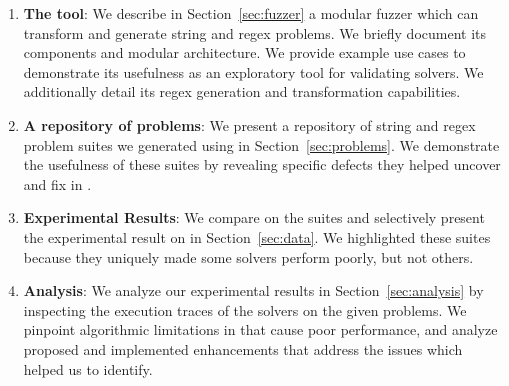         \begin{enumerate}
            \item \textbf{The \fuzzer{} tool}: We describe in Section~\ref{sec:fuzzer} a modular fuzzer which can transform and generate \smtfull{} string and regex problems. We briefly document its components and modular architecture. We provide example use cases to demonstrate its usefulness as an exploratory tool for validating solvers. We additionally detail its regex generation and transformation capabilities.
            \item \textbf{A repository of \smtfull{} problems}: We present a repository of \smtfull{} string and regex problem suites we generated using \fuzzer{} in Section~\ref{sec:problems}. We demonstrate the usefulness of these suites by revealing specific defects they helped uncover and fix in \us{}.
            \item \textbf{Experimental Results}: We compare \theSolvers{} on the \fuzzer{} suites and selectively present the experimental result on \theSuites{} in Section~\ref{sec:data}. We highlighted these suites because they uniquely made some solvers perform poorly, but not others.
            \item \textbf{Analysis}: We analyze our experimental results in Section~\ref{sec:analysis} by inspecting the execution traces of the solvers on the given problems. We pinpoint algorithmic limitations in \us{} that cause poor performance, and analyze proposed and implemented enhancements that address the issues which \fuzzer{} helped us to identify.
        \end{enumerate}

